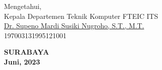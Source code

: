 \vspace{\fill}
\begin{center}

  Mengetahui, \\
  Kepala Departemen Teknik Komputer FTEIC ITS \\
  \vspace{\fill}
  \underline{Dr. Supeno Mardi Susiki Nugroho, S.T., M.T.} \\
  197003131995121001
  
\end{center}


\begin{center}
  \textbf{SURABAYA} \\
  \textbf{Juni, 2023}
\end{center}
\endgroup

